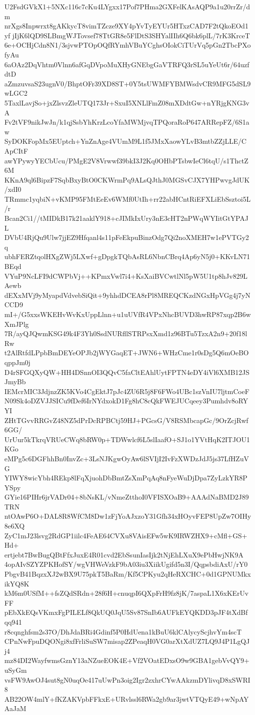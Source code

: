 U2FsdGVkX1+5NXc116c7cKu4LYgxx17Pof7PHma2GXFelKAsAQP9a1u20rrZr/dm
nrXgs8Inpwrxt8gAKkycT8vimTZcze9XY4pYvTyEYUr5HTxzCAD7F2tQkoEOd1yf
jIjK6lQD9SLBmgWJTovsef78TtGR8e5FlDtS3SHYalIIh6Q6bk6plL/7rK3KrceT
6e+OCHjCdn8N1/3sjvwPTOpOQfRYmhVBuYCghsOIokCiTUrVq5pGn2TbcPXofyAu
6aOAz2DqVhtm0Vlnn6afGqDVpoMuXHyGNEbgGaVTRFQ3rSL5uYeUt6r/64uzfdtD
aZmzuvsaS23ugnV0/BhptOFr39XD8ST+0Y5tsUWMFYBMWsdvCR9MFG5dSL9wLGC2
5TaxlLavjSo+jxZlsvzZleUTQ173Jr+SxuI5XNLlFmZ08mXDdtGw+nYRjgKNG3vA
Fv2tVF9nikJwJn/k1qjSsbYhKrzLcoYfaMWMjvqTPQoraRoP647ARRepFZ/6S1aw
SyDOKFopMx5EUptch+YnZnAge4VUmM9L1f5JMxXaowYLvB3mtbZZjLLE/CApCItF
awYPywyYECbUcu/PMgE2V8Vrwwf39bkI3J2Kq0OHbPTsbwIeCl6tqU/s1ThctZ6M
KKnA9ql6BipzF7SqbBxyBtO0CKWrmPq9ALsQJthJ0MGSvCJX7YHPwvgJdUK/xdI0
TRmmc1yqbiN+vKMP95FMtEeEv6WMf0UtIh+rr22abHCntRiEFXLiEbSsztoi5L/r
Bcan2Ci1//tMIDkB17k21aaklY918+cJIMkIxUry3nE3cHT2nPWqWYIitGtYPAJL
DVbU4RjQu9Ulw7jjEZ9Hfqanl4s11pFeEkpuBinzOdg7Qi2noXMEH7w1ePVTGy2q
ubhFERZtqolHXgZWj5LXwf+gDpgkTQbAsRL6NbnCBrq4Ap6yN5j0+KKvLN71BEqd
VYuP9NcLFI9dCWPbVj++KPmxVwl7i4+KsXaiBVCwtlNl5pW5U1tp8hJv829LAewb
dEXxMVj9yMyapdVdvebSiQit+9yhhdDCEA8rPl8MREQCKzdNGxHpVGg4j7yNCCD9
mI+/G5xxsWKEHvWvKxUppLlnn+u1uUVfR4VPxNhcBUVD3hwRP87xqp2B6wXmJPlg
7R/ayQJQwmKSG49k4F3Yh0SsdNURfllSTRPsxXmd1z96BTu5TzxA2n9+20f18lRw
t2AlRtfdLPpbBmDEYeOPJb2jWYGaqET+JWN6+WHzCme1r0sDg5Q6mOeBOqppJm0j
D4rSFGQXyQW+HH4DSnnOI3QQvC5faCltEAhlUytFPTN4eDY4iVl6XMB12JSJmyBb
IEMcrMIC3JdjnzZK5KVo4CgEktJ7pJc4ZU6R5j8F6FWo4UBc1szVnIU7ljtmCoeF
N09Sk4oDZVJJSICu9fDef6IrNYdxokD1Fg8hC8cQkFWEJUCqeey3Pumhdv8oRYYI
ZHtTGvvRRGvZ48NZ5dPrDcRPBCtj59HJ+PGcsG/V8RSMbcapGc/9OrZcjRwf6GG/
UrUur5kTkrqVRUeCWq8bRW0p+TDWwlcf6L5slIaafO+SJ1o1YVtHqK2ITJOU1KGo
eMPg5c6DGFhhBn0InvZc+3LsNJKgwOyAw6lSVIjI2IvFzXWDzJdJ5js37LfHZuVG
YIWY8wicYbh4REkp8lFqXjuohDbBmtZsXmPqAq8nFyeWuDjDpa7ZyLzkYR8PYSpy
GYie16PIHr6jrVADr04+8bNsKL/vNmeZtthoI0VFISXOaB9+AAAdNaBMD2J89TRN
ntOAwP6O+DAL8R8WfCM8Dw1zFjYoAJxzoY31Gfh34xHOyvFEP8UpZw7OIHy8e6XQ
ZyC1mJ23lsvg2RdGP1iilc4FeAE64CVXu8VAisEFw5wK9IRWZHX9+cMfl+GS+Hd+
ertjebt7BwBugQBtFfxJuxE4R01cvd2EbSsunIasIjk2tNjEhLXuX9ePbHwjNK9A
4opAIvSZYZPKHofSY/wgVHWeVzkF9bA03iu3XiikUgifd5n3I/QqpsbdiAxU/rY0
PbgvB41BqzxXJ2wBX9U75pkT5BaRm/Kf5CPKyu2qHeRXCHC+0d1GPNUMkxikYQ8K
kM6m0USfM++fsZQdSRdn+28f6H+cnuqpI6QXpFrH9fz8jK/7aspaL1X6xKErUvFF
pEbXkEQsVKmxFgPILELf8QkUQ0JqU5Sv87SnIb6AUFkEYQKDD3pJF4tXdBfqq941
r8cqnghfsm2s37O/DhJdaBRi4Gdinf5P0HdUena1kBuU6klCAlycyScjhvYm4scT
CPnNwFpuDQONgi8xfFrliSuSW7misap2ZPeaqH0VG0arXtXdUZ7LQ9J4P1LgQJj4
mz84DI2WayfwmsGznY13aNZueEOK4E+Vf2VOatEDxsO9w9GBA1gebVvQY9+uSyGm
vsFW9AwOJ4sut8gN0uqOe417uUwPn3oig2Igr2zxhrCYwAAkzmDYlivqD8xSWRI8
AB22OW4mlY+fKZAKVpbFFkxE+URvlssl6RWa2gb9ar3jwtVTQyE49+wNpAYAaJaM
